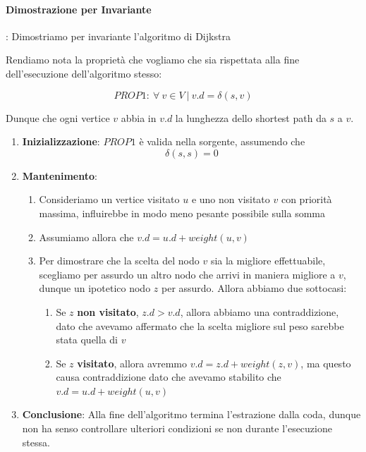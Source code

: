 \documentclass{article}
\begin{document}
\newpage

\paragraph{Dimostrazione per Invariante}: Dimostriamo per invariante l'algoritmo di Dijkstra

Rendiamo nota la proprietà che vogliamo che sia rispettata alla fine dell'esecuzione dell'algoritmo stesso:

\vskip 1cm

\begin{equation}
    PROP1: \: \forall \: v \in V \: | \: v.d = \delta(s,v)
\end{equation}

\vskip 1cm

Dunque che ogni vertice $v$ abbia in $v.d$ la lunghezza dello shortest path da $s$ a $v$.

\begin{enumerate}
    \item \textbf{Inizializzazione}: $PROP1$ è valida nella sorgente, 
    assumendo che
\[\delta(s,s) = 0\]

\vskip 1cm

    \item \textbf{Mantenimento}:
    \begin{enumerate}
        \item Consideriamo un vertice visitato $u$ e uno non visitato $v$ con priorità massima, influirebbe in modo meno pesante possibile sulla somma
        \item Assumiamo allora che $v.d = u.d + weight(u,v)$
        \item Per dimostrare che la scelta del nodo $v$ sia la migliore effettuabile, scegliamo per assurdo un altro nodo che arrivi in maniera migliore a $v$, dunque un ipotetico nodo $z$ per assurdo. Allora abbiamo due sottocasi:
        \begin{enumerate}
            \item Se $z$ \textbf{non visitato}, $z.d > v.d$, allora abbiamo una contraddizione, dato che avevamo affermato che la scelta migliore sul peso sarebbe stata quella di $v$
            \item Se $z$ \textbf{visitato}, allora avremmo $v.d = z.d + weight(z,v)$, ma questo causa contraddizione dato che avevamo stabilito che $v.d = u.d + weight(u,v)$
        \end{enumerate}
    \end{enumerate} 

    \vskip 2cm

    
    \item \textbf{Conclusione}: Alla fine dell'algoritmo termina l'estrazione dalla coda, dunque non ha senso controllare ulteriori condizioni se non durante l'esecuzione stessa.
\end{enumerate}
\end{document}
